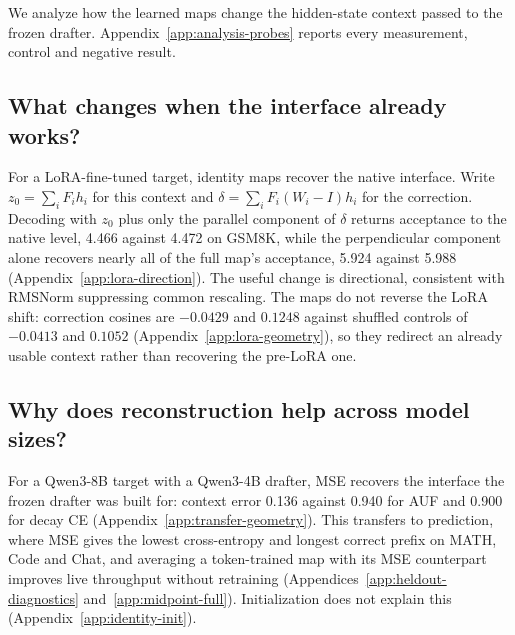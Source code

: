 We analyze how the learned maps change the hidden-state context passed to the frozen drafter. Appendix~\ref{app:analysis-probes} reports every measurement, control and negative result.

\subsection{What changes when the interface already works?}
\label{sec:analysis-lora}
For a LoRA-fine-tuned target, identity maps recover the native interface. Write $z_0=\sum_i F_i h_i$ for this context and $\delta=\sum_i F_i(W_i-I)h_i$ for the correction. Decoding with $z_0$ plus only the parallel component of $\delta$ returns acceptance to the native level, 4.466 against 4.472 on GSM8K, while the perpendicular component alone recovers nearly all of the full map's acceptance, 5.924 against 5.988 (Appendix~\ref{app:lora-direction}). The useful change is directional, consistent with RMSNorm suppressing common rescaling. The maps do not reverse the LoRA shift: correction cosines are $-0.0429$ and $0.1248$ against shuffled controls of $-0.0413$ and $0.1052$ (Appendix~\ref{app:lora-geometry}), so they redirect an already usable context rather than recovering the pre-LoRA one.

\subsection{Why does reconstruction help across model sizes?}
\label{sec:analysis-transfer}
For a Qwen3-8B target with a Qwen3-4B drafter, MSE recovers the interface the frozen drafter was built for: context error 0.136 against 0.940 for AUF and 0.900 for decay CE (Appendix~\ref{app:transfer-geometry}). This transfers to prediction, where MSE gives the lowest cross-entropy and longest correct prefix on MATH, Code and Chat, and averaging a token-trained map with its MSE counterpart improves live throughput without retraining (Appendices~\ref{app:heldout-diagnostics} and~\ref{app:midpoint-full}). Initialization does not explain this (Appendix~\ref{app:identity-init}).

